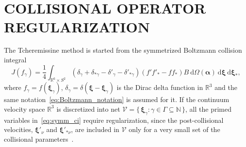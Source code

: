 \documentclass{aip-cp}
\newcommand{\dd}{\:\mathrm{d}}
\newcommand{\dxi}{\dd\boldsymbol{\xi}}
\newcommand{\bxi}{\boldsymbol{\xi}}
\newcommand{\Set}[2]{\{\,{#1}:{#2}\,\}}
\begin{document}
\section{COLLISIONAL OPERATOR REGULARIZATION}

The Tcheremissine method is started from the symmetrized Boltzmann collision integral
\begin{equation}\label{eq:symm_ci}
    J(f_\gamma) = \frac14\int_{\mathbb{R}^6\times S^2} \left(
        \delta_\gamma + \delta_{*\gamma} - \delta'_\gamma - \delta'_{*\gamma}
    \right) (f'f'_* - ff_*)B \dd\Omega(\boldsymbol{\alpha}) \dxi\dxi_*,
\end{equation}
where \(f_\gamma = f(\bxi_\gamma)\),
\(\delta_\gamma = \delta(\bxi-\bxi_\gamma)\) is the Dirac delta function in \(\mathbb{R}^3\)
and the same notation~\eqref{eq:Boltzmann_notation} is assumed for it.
If the continuum velocity space \(\mathbb{R}^3\) is discretized
into net \(\mathcal{V} = \Set{\bxi_\gamma}{\gamma\in\Gamma\subseteq\mathbb{N}}\),
all the primed variables in~\eqref{eq:symm_ci} require regularization,
since the post-collisional velocities, \(\bxi'_\nu\) and \(\bxi'_{*\nu}\),
are included in \(\mathcal{V}\) only for a very small set of the collisional parameters~\cite{Palczewski1997}.
\end{document}
